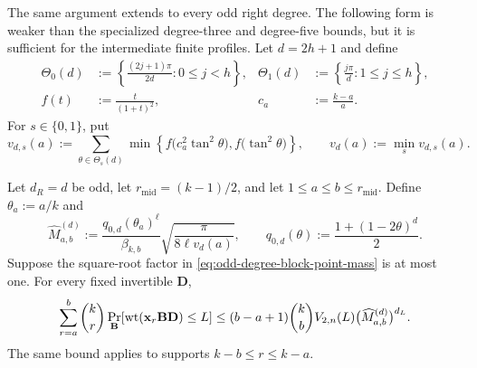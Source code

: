 The same argument extends to every odd right degree.  The following form is
weaker than the specialized degree-three and degree-five bounds, but it is
sufficient for the intermediate finite profiles.  Let $d=2h+1$ and define
\begin{align*}
 \Theta_0(d)&:=\left\{\frac{(2j+1)\pi}{2d}:0\leq j<h\right\},&
 \Theta_1(d)&:=\left\{\frac{j\pi}{d}:1\leq j\leq h\right\},\\
 f(t)&:=\frac{t}{(1+t)^2},&c_a&:=\frac{k-a}{a}.
\end{align*}
For $s\in\{0,1\}$, put
\begin{equation}
 v_{d,s}(a):=
 \sum_{\theta\in\Theta_s(d)}
 \min\left\{f\bigl(c_a^2\tan^2\theta\bigr),
                   f\bigl(\tan^2\theta\bigr)\right\},
 \qquad
 v_d(a):=\min_s v_{d,s}(a).
 \label{eq:odd-degree-uniform-variance}
\end{equation}

\begin{lemma}
\label{lem:odd-degree-central-block}
Let $d_R=d$ be odd, let $r_{\mathrm{mid}}=(k-1)/2$, and let
$1\leq a\leq b\leq r_{\mathrm{mid}}$.  Define $\theta_a:=a/k$ and
\begin{equation}
 \widehat M^{(d)}_{a,b}:=
 \frac{q_{0,d}(\theta_a)^\ell}{\beta_{k,b}}
 \sqrt{\frac{\pi}{8\ell v_d(a)}},
 \qquad
 q_{0,d}(\theta):=\frac{1+(1-2\theta)^d}{2}.
 \label{eq:odd-degree-block-point-mass}
\end{equation}
Suppose the square-root factor in
\eqref{eq:odd-degree-block-point-mass} is at most one.  For every fixed
invertible $\mathbf D$,
\begin{equation}
 \sum_{r=a}^{b}\binom{k}{r}
 \Pr_{\mathbf B}[\operatorname{wt}(\mathbf x_r\mathbf B\mathbf D)\leq L]
 \leq(b-a+1)\binom{k}{b}V_{2,n}(L)
 \bigl(\widehat M^{(d)}_{a,b}\bigr)^{d_L}.
 \label{eq:odd-degree-central-block}
\end{equation}
The same bound applies to supports $k-b\leq r\leq k-a$.
\end{lemma}

